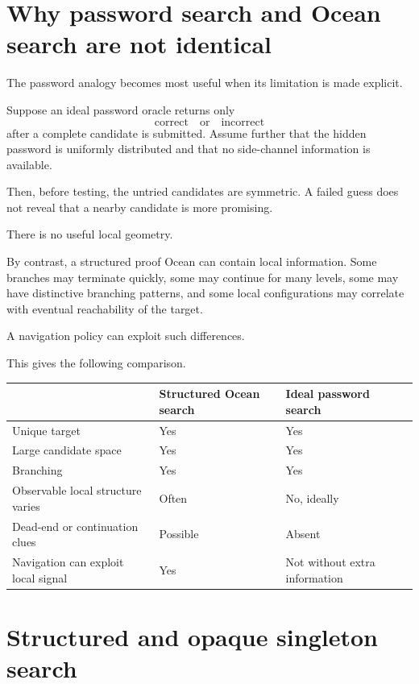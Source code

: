 \documentclass[11pt]{article}
\begin{document}
\section{Why password search and Ocean search are not identical}

The password analogy becomes most useful when its limitation is made explicit.

Suppose an ideal password oracle returns only
\[
\text{correct}
\quad\text{or}\quad
\text{incorrect}
\]
after a complete candidate is submitted. Assume further that the hidden
password is uniformly distributed and that no side-channel information is
available.

Then, before testing, the untried candidates are symmetric. A failed guess
does not reveal that a nearby candidate is more promising.

There is no useful local geometry.

By contrast, a structured proof Ocean can contain local information. Some
branches may terminate quickly, some may continue for many levels, some may
have distinctive branching patterns, and some local configurations may
correlate with eventual reachability of the target.

A navigation policy can exploit such differences.

This gives the following comparison.

\begin{center}
\begin{tabular}{>{\raggedright\arraybackslash}p{}
                >{\centering\arraybackslash}p{}
                >{\centering\arraybackslash}p{}}
\toprule
 & \textbf{Structured Ocean search} & \textbf{Ideal password search} \\
\midrule
Unique target & Yes & Yes \\
Large candidate space & Yes & Yes \\
Branching & Yes & Yes \\
Observable local structure varies & Often & No, ideally \\
Dead-end or continuation clues & Possible & Absent \\
Navigation can exploit local signal & Yes & Not without extra information \\
\bottomrule
\end{tabular}
\end{center}

\section{Structured and opaque singleton search}
\end{document}
